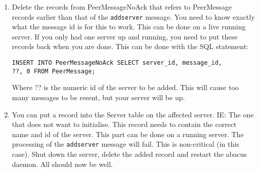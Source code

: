 \documentclass[12pt,a4paper]{article}
\begin{document}
\begin{enumerate}
\item{Delete the records from PeerMessageNoAck that refers to PeerMessage records earlier than that of the \texttt{addserver} message.  You need to know exactly what the message id is for this to work.  This can be done on a live running server.  If you only had one server up and running, you need to put these records back when you are done.  This can be done with the SQL statement:

\texttt{INSERT INTO PeerMessageNoAck SELECT server\_id, message\_id,\\??, 0 FROM PeerMessage;}

Where ?? is the numeric id of the server to be added.  This will cause too many messages to be resent, but your server will be up.}
\item{You can put a record into the Server table on the affected server.  IE:  The one that does not want to initialise.  This record needs to contain the correct name and id of the server.  This part can be done on a running server.  The processing of the \texttt{addserver} message will fail.  This is non-critical (in this case).  Shut down the server, delete the added record and restart the abacus daemon.  All should now be well.}
\end{enumerate}
\end{document}
